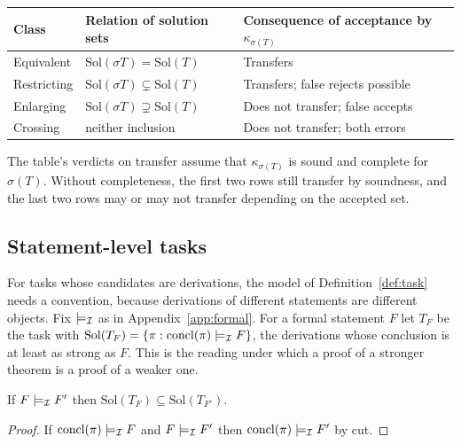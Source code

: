 \begin{center}
\small
\begin{tabular}{@{}lll@{}}
\toprule
Class & Relation of solution sets & Consequence of acceptance by $\kappa_{\sigma(T)}$ \\
\midrule
Equivalent & $\mathrm{Sol}(\sigma T)=\mathrm{Sol}(T)$ & Transfers \\
Restricting & $\mathrm{Sol}(\sigma T)\subsetneq\mathrm{Sol}(T)$ & Transfers; false rejects possible \\
Enlarging & $\mathrm{Sol}(\sigma T)\supsetneq\mathrm{Sol}(T)$ & Does not transfer; false accepts \\
Crossing & neither inclusion & Does not transfer; both errors \\
\bottomrule
\end{tabular}
\end{center}

The table's verdicts on transfer assume that $\kappa_{\sigma(T)}$ is sound and complete for $\sigma(T)$. Without completeness, the first two rows still transfer by soundness, and the last two rows may or may not transfer depending on the accepted set.

\subsection*{Statement-level tasks}

For tasks whose candidates are derivations, the model of Definition~\ref{def:task} needs a convention, because derivations of different statements are different objects. Fix $\models_{\mathcal{I}}$ as in Appendix~\ref{app:formal}. For a formal statement $F$ let $T_F$ be the task with $\mathrm{Sol}(T_F)=\{\pi : \mathrm{concl}(\pi)\models_{\mathcal{I}} F\}$, the derivations whose conclusion is at least as strong as $F$. This is the reading under which a proof of a stronger theorem is a proof of a weaker one.

\begin{lemma}
\label{lem:direction}
If $F\models_{\mathcal{I}} F'$ then $\mathrm{Sol}(T_F)\subseteq \mathrm{Sol}(T_{F'})$.
\end{lemma}

\begin{proof}
If $\mathrm{concl}(\pi)\models_{\mathcal{I}} F$ and $F\models_{\mathcal{I}} F'$ then $\mathrm{concl}(\pi)\models_{\mathcal{I}} F'$ by cut.
\end{proof}

